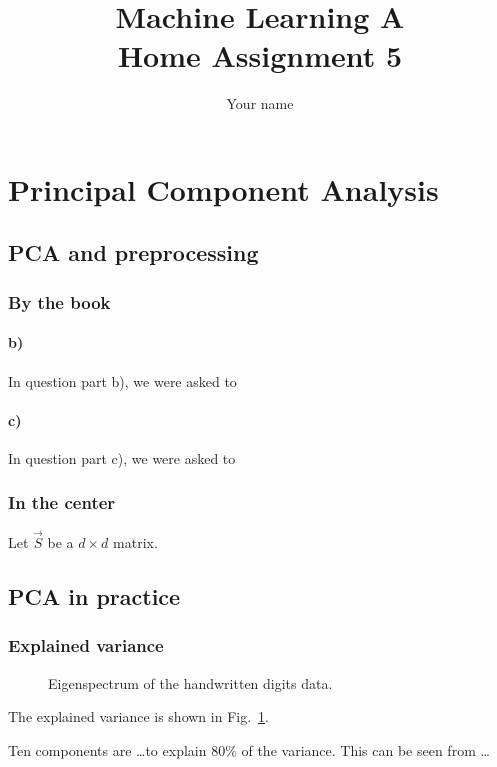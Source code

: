 \documentclass[a4paper,12pt]{article}
\begin{document}
\title{Machine Learning A\\Home Assignment 5}
\author{\color{red}Your name}
\date{}
\maketitle


\section{Principal Component Analysis}

\subsection{PCA and preprocessing}
\subsubsection{By the book}
\paragraph{b)}
In question part b), we were asked to 

\paragraph{c)}
In question part c), we were asked to 


\subsubsection{In the center}
Let $\vec{S}$ be a  $d \times d$  matrix.

\subsection{PCA in practice}

\subsubsection{Explained variance}
\begin{figure}
    \centering
    \caption{Eigenspectrum of the handwritten digits data.}
    \label{fig:my_figure}
\end{figure}

The  explained variance is shown in Fig.~\ref{fig:my_figure}.

Ten components are  \dots to explain 80\% of the variance.
This can be seen from \dots
\end{document}
